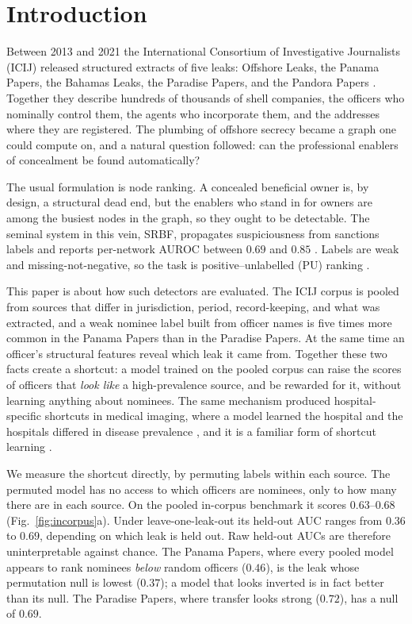 \documentclass[11pt]{article}
\begin{document}
\section{Introduction}
Between 2013 and 2021 the International Consortium of Investigative Journalists
(ICIJ) released structured extracts of five leaks: Offshore Leaks, the Panama
Papers, the Bahamas Leaks, the Paradise Papers, and the Pandora Papers
\citep{icij}. Together they describe hundreds of thousands of shell companies, the
officers who nominally control them, the agents who incorporate them, and the
addresses where they are registered. The plumbing of offshore secrecy became a
graph one could compute on, and a natural question followed: can the professional
enablers of concealment be found automatically?

The usual formulation is node ranking. A concealed beneficial owner is, by design,
a structural dead end, but the enablers who stand in for owners are among the
busiest nodes in the graph, so they ought to be detectable. The seminal system in
this vein, SRBF, propagates suspiciousness from sanctions labels and reports
per-network AUROC between $0.69$ and $0.85$ \citep{srbf}. Labels are weak and
missing-not-negative, so the task is positive--unlabelled (PU) ranking
\citep{pusurvey}.

This paper is about how such detectors are evaluated. The ICIJ corpus is pooled
from sources that differ in jurisdiction, period, record-keeping, and what was
extracted, and a weak nominee label built from officer names is five times more
common in the Panama Papers than in the Paradise Papers. At the same time an
officer's structural features reveal which leak it came from. Together these two
facts create a shortcut: a model trained on the pooled corpus can raise the
scores of officers that \emph{look like} a high-prevalence source, and be rewarded
for it, without learning anything about nominees. The same mechanism produced
hospital-specific shortcuts in medical imaging, where a model learned the hospital
and the hospitals differed in disease prevalence \citep{zech2018variable}, and it
is a familiar form of shortcut learning \citep{geirhos2020shortcut}.

We measure the shortcut directly, by permuting labels within each source. The
permuted model has no access to which officers are nominees, only to how many
there are in each source. On the pooled in-corpus benchmark it scores $0.63$--$0.68$
(Fig.~\ref{fig:incorpus}a). Under leave-one-leak-out its held-out AUC ranges from
$0.36$ to $0.69$, depending on which leak is held out. Raw held-out AUCs are
therefore uninterpretable against chance. The Panama Papers, where every pooled
model appears to rank nominees \emph{below} random officers ($0.46$), is the leak
whose permutation null is lowest ($0.37$); a model that looks inverted is in fact
better than its null. The Paradise Papers, where transfer looks strong ($0.72$), has
a null of $0.69$.
\end{document}
